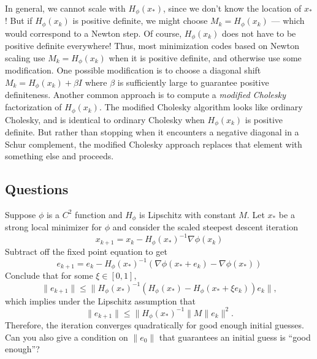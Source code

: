 \documentclass[12pt, leqno]{article} %
\begin{document}
In general, we cannot scale with \(H_{\phi}(x_*)\), since we don't know
the location of \(x_*\)! But if \(H_{\phi}(x_k)\) is positive definite,
we might choose \(M_k = H_{\phi}(x_k)\) --- which would correspond to a
Newton step. Of course, \(H_{\phi}(x_k)\) does not have to be positive
definite everywhere! Thus, most minimization codes based on Newton
scaling use \(M_k = H_{\phi}(x_k)\) when it is positive definite, and
otherwise use some modification. One possible modification is to choose
a diagonal shift \(M_k = H_{\phi}(x_k) + \beta I\) where \(\beta\) is
sufficiently large to guarantee positive definiteness. Another common
approach is to compute a \emph{modified Cholesky} factorization of
\(H_{\phi}(x_k)\). The modified Cholesky algorithm looks like ordinary
Cholesky, and is identical to ordinary Cholesky when \(H_{\phi}(x_k)\)
is positive definite. But rather than stopping when it encounters a
negative diagonal in a Schur complement, the modified Cholesky approach
replaces that element with something else and proceeds.

\subsection{Questions}

Suppose \(\phi\) is a \(C^2\) function and \(H_{\phi}\) is Lipschitz
with constant \(M\). Let \(x_*\) be a strong local minimizer for
\(\phi\) and consider the scaled steepest descent iteration
\[x_{k+1} = x_k - H_{\phi}(x_*)^{-1} \nabla \phi(x_k)\] Subtract off the
fixed point equation to get
\[e_{k+1} = e_k - H_{\phi}(x_*)^{-1} \left( \nabla \phi(x_*+e_k) - \nabla \phi(x_*) \right)\]
Conclude that for some \(\xi \in [0,1]\),
\[\|e_{k+1}\| \leq \| H_{\phi}(x_*)^{-1} \left(H_{\phi}(x_*) - H_{\phi}(x_* + \xi e_k)\right) e_k \|,\]
which implies under the Lipschitz assumption that
\[\|e_{k+1}\| \leq \|H_{\phi}(x_*)^{-1}\| M \|e_k\|^2.\] Therefore, the
iteration converges quadratically for good enough initial guesses. Can
you also give a condition on \(\|e_0\|\) that guarantees an initial
guess is ``good enough''?
\end{document}
